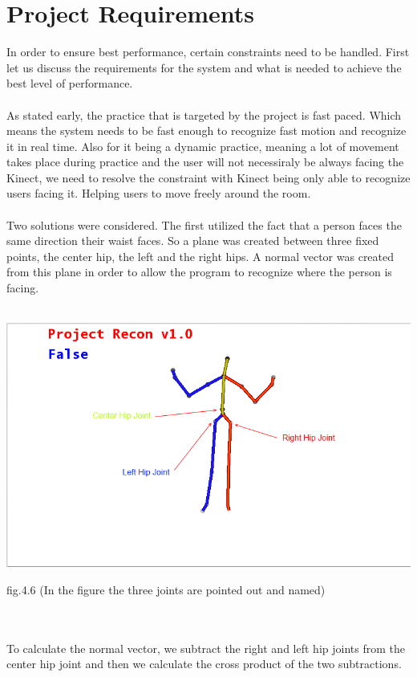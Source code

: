 \section{Project Requirements}
In order to ensure best performance, certain constraints need to be handled. First let us discuss the requirements for the system and what is needed to achieve the best level of performance. 
\\
\\
As stated early, the practice that is targeted by the project is fast paced. Which means the system needs to be fast enough to recognize fast motion and recognize it in real time. Also for it being a dynamic practice, meaning a lot of movement takes place during practice and the user will not necessiraly be always facing the Kinect, we need to resolve the constraint with Kinect being only able to recognize users facing it. Helping users to move freely around the room.
\\
\\
Two solutions were considered. The first utilized the fact that a person faces the same direction their waist faces. So a plane was created between three fixed points, the center hip, the left and the right hips. A normal vector was created from this plane in order to allow the program to recognize where the person is facing. 
\\
\\
\centerline{\includegraphics[scale=0.5]{skeleton_frame3.png}}
\centerline{fig.4.6 (In the figure the three joints are pointed out and named)}
\\
\\
To calculate the normal vector, we subtract the right and left hip joints from the center hip joint and then we calculate the cross product of the two subtractions.
